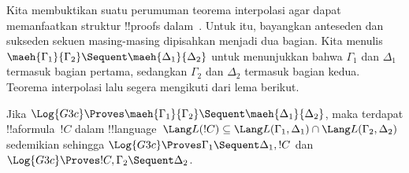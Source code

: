 \documentclass[../../../include/open-logic-section]{subfiles}
\begin{document}
Kita membuktikan suatu perumuman teorema interpolasi agar dapat memanfaatkan
struktur !!{proof}s dalam~. Untuk itu, bayangkan anteseden dan
sukseden sekuen masing-masing dipisahkan menjadi dua bagian. Kita menulis
$\maeh{\Gamma_1}{\Gamma_2} \Sequent \maeh{\Delta_1}{\Delta_2}$ untuk
menunjukkan bahwa $\Gamma_1$ dan $\Delta_1$ termasuk bagian pertama,
sedangkan $\Gamma_2$ dan $\Delta_2$ termasuk bagian kedua. Teorema
interpolasi lalu segera mengikuti dari lema berikut.

\begin{lem}
Jika $\Log{G3c} \Proves \maeh{\Gamma_1}{\Gamma_2} \Sequent
\maeh{\Delta_1}{\Delta_2}$, maka terdapat !!a{formula}~$!C$ dalam
!!{language}~$\Lang L(!C) \subseteq \Lang L(\Gamma_1, \Delta_1) \cap
\Lang L(\Gamma_2, \Delta_2)$ sedemikian sehingga $\Log{G3c} \Proves
\Gamma_1 \Sequent \Delta_1, !C$ dan $\Log{G3c} \Proves !C, \Gamma_2
\Sequent \Delta_2$.
\end{lem}
\end{document}
